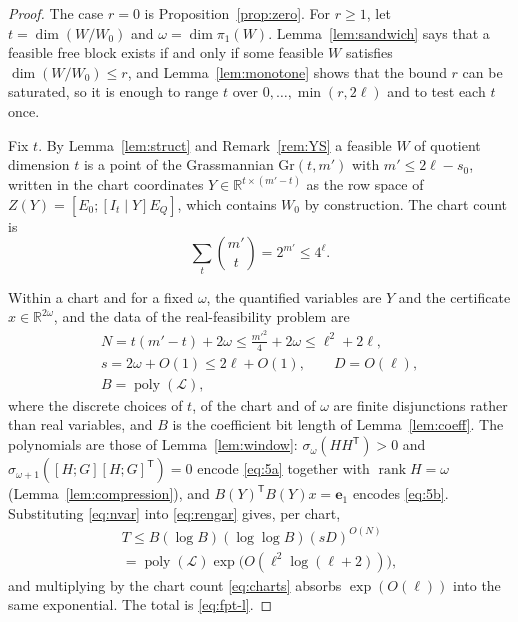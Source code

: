 \documentclass[journal]{IEEEtran}
\theoremstyle{plainn}
\theoremstyle{remark}
\begin{document}
\begin{proof}
The case $r=0$ is Proposition~\ref{prop:zero}. For $r\ge1$, let $t=\dim(W/W_0)$ and
$\omega=\dim\pi_1(W)$. Lemma~\ref{lem:sandwich} says that a feasible free block exists if and
only if some feasible $W$ satisfies $\dim(W/W_0)\le r$, and Lemma~\ref{lem:monotone} shows that
the bound $r$ can be saturated, so it is enough to range $t$ over $0,\dots,\min(r,2\ell)$ and to
test each $t$ once.

Fix $t$. By Lemma~\ref{lem:struct} and Remark~\ref{rem:YS} a feasible $W$ of quotient dimension
$t$ is a point of the Grassmannian $\mathrm{Gr}(t,m')$ with $m'\le2\ell-s_0$, written in the chart
coordinates $Y\in\mathbb R^{t\times(m'-t)}$ as the row space of $Z(Y)=[E_0;[I_t\mid Y]E_Q]$, which
contains $W_0$ by construction. The chart count is
\begin{equation}\label{eq:charts}
\sum_{t}\binom{m'}{t}=2^{m'}\le4^{\ell}.
\end{equation}

Within a chart and for a fixed $\omega$, the quantified variables are $Y$ and the certificate
$x\in\mathbb R^{2\omega}$, and the data of the real-feasibility problem are
\begin{equation}\label{eq:nvar}
\begin{gathered}
N=t(m'-t)+2\omega\le\tfrac{m'^2}{4}+2\omega\le\ell^2+2\ell,\\
s=2\omega+O(1)\le2\ell+O(1),\qquad D=O(\ell),\\
B=\operatorname{poly}(\mathcal L),
\end{gathered}
\end{equation}
where the discrete choices of $t$, of the chart and of $\omega$ are finite disjunctions rather
than real variables, and $B$ is the coefficient bit length of Lemma~\ref{lem:coeff}. The
polynomials are those of Lemma~\ref{lem:window}: $\sigma_\omega(HH^{\mathsf T})>0$ and
$\sigma_{\omega+1}([H;G][H;G]^{\mathsf T})=0$ encode \eqref{eq:5a} together with
$\operatorname{rank}H=\omega$ (Lemma~\ref{lem:compression}), and $B(Y)^{\mathsf T}B(Y)x=\mathbf
e_1$ encodes \eqref{eq:5b}. Substituting \eqref{eq:nvar} into \eqref{eq:rengar} gives, per
chart,
\begin{equation*}
\begin{gathered}
T\le B(\log B)(\log\log B)(sD)^{O(N)}\\
=\operatorname{poly}(\mathcal L)\exp\bigl(O(\ell^2\log(\ell+2))\bigr),
\end{gathered}
\end{equation*}
and multiplying by the chart count \eqref{eq:charts} absorbs $\exp(O(\ell))$ into the same
exponential. The total is \eqref{eq:fpt-l}.
\end{proof}
\end{document}

